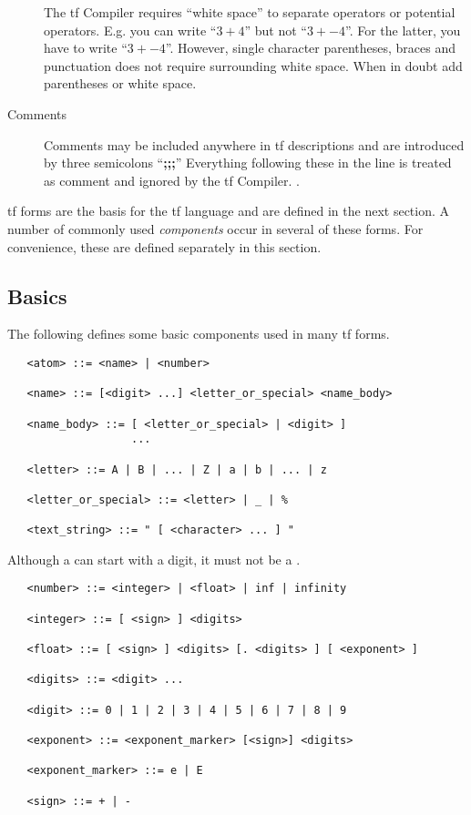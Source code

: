 \begin{description}
The {\sc tf} Compiler requires ``white space'' to separate operators or
potential operators.  E.g. you can write ``$3+4$'' but not ``$3+-4$''.  For the
latter, you have to write ``$3 + -4$''.  However, single character parentheses,
braces and punctuation does not require surrounding white space.  When in
doubt add parentheses or white space.

\item[Comments]
Comments may be included anywhere in {\sc tf} descriptions
and are introduced by three semicolons ``{\bf ;;;}''
Everything following these in the line is treated as comment
and ignored by the {\sc tf} Compiler.
\index{{\bf ;;;}}.

\end{description}


{\sc tf} forms are the basis for the {\sc tf} language and are defined in the
next section.  A number of commonly used {\em components} occur in several
of these forms.  For convenience, these are defined separately  in this
section.

\subsection{Basics}

The following defines some basic components used in many {\sc tf} forms.

\begin{verbatim}
   <atom> ::= <name> | <number>

   <name> ::= [<digit> ...] <letter_or_special> <name_body>

   <name_body> ::= [ <letter_or_special> | <digit> ]
                   ...

   <letter> ::= A | B | ... | Z | a | b | ... | z

   <letter_or_special> ::= <letter> | _ | %

   <text_string> ::= " [ <character> ... ] "
\end{verbatim}

Although a  can start with a digit, it must not be a .

\begin{verbatim}
   <number> ::= <integer> | <float> | inf | infinity

   <integer> ::= [ <sign> ] <digits>

   <float> ::= [ <sign> ] <digits> [. <digits> ] [ <exponent> ]

   <digits> ::= <digit> ...

   <digit> ::= 0 | 1 | 2 | 3 | 4 | 5 | 6 | 7 | 8 | 9

   <exponent> ::= <exponent_marker> [<sign>] <digits>

   <exponent_marker> ::= e | E

   <sign> ::= + | -
\end{verbatim}


